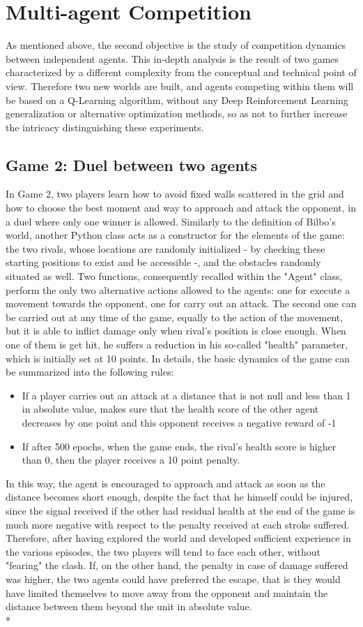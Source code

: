\section{Multi-agent Competition}
As mentioned above, the second objective is the study of competition dynamics between independent agents. This in-depth analysis is the result of two games characterized by a different complexity from the conceptual and technical point of view. Therefore two new worlds are built, and agents competing within them will be based on a Q-Learning algorithm, without any Deep Reinforcement Learning generalization or alternative optimization methods, so as not to further increase the intricacy distinguishing these experiments.
\subsection{Game 2: Duel between two agents}
In Game 2, two players learn how to avoid fixed walls scattered in the grid and how to choose the best moment and way to approach and attack the opponent, in a duel where only one winner is allowed. Similarly to the definition of Bilbo's world, another Python class acts as a constructor for the elements of the game: the two rivals, whose locations are randomly initialized - by checking these starting positions to exist and be accessible -, and the obstacles randomly situated as well. Two functions, consequently recalled within the "Agent" class, perform the only two alternative actions allowed to the agents: one for execute a movement towards the opponent, one for carry out an attack. The second one can be carried out at any time of the game, equally to the action of the movement, but it is able to inflict damage only when rival's position is close enough. When one of them is get hit, he suffers a reduction in his so-called "health" parameter, which is initially set at 10 points. In details, the basic dynamics of the game can be summarized into the following rules:
\begin{itemize}
  \item If a player carries out an attack at a distance that is not null and less than 1 in absolute value, makes sure that the health score of the other agent decreases by one point and this opponent receives a negative reward of -1
  \item If after 500 epochs, when the game ends, the rival's health score is higher than 0, then the player receives a 10 point penalty.
\end{itemize}
In this way, the agent is encouraged to approach and attack as soon as the distance becomes short enough, despite the fact that he himself could be injured, since the signal received if the other had residual health at the end of the game is much more negative with respect to the penalty received at each stroke suffered. Therefore, after having explored the world and developed sufficient experience in the various episodes, the two players will tend to face each other, without "fearing" the clash. If, on the other hand, the penalty in case of damage suffered was higher, the two agents could have preferred the escape, that is they would have limited themselves to move away from the opponent and maintain the distance between them beyond the unit in absolute value.\\*
